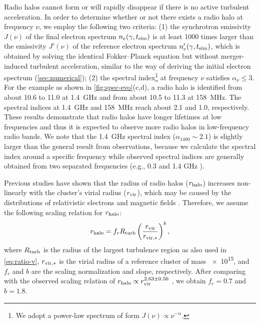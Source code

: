 Radio halos cannot form or will rapidly disappear if there is no active
turbulent acceleration.
In order to determine whether or not there exists a radio halo at frequency
$\nu$, we employ the following two criteria:
(1) the synchrotron emissivity $J(\nu)$ of the final electron spectrum
$n_e(\gamma, t_{\mathrm{sim}})$ is at least \num{1000} times larger than the
emissivity $J'(\nu)$ of the reference electron spectrum
$n'_e(\gamma, t_{\mathrm{sim}})$, which is obtained by solving the identical
Fokker--Planck equation but without merger-induced turbulent acceleration,
similar to the way of deriving the initial electron spectrum
(\autoref{sec:numerical});
(2) the spectral index\footnote{%
  We adopt a power-law spectrum of form $J(\nu) \propto \nu^{-\alpha}$.}
at frequency $\nu$ satisfies $\alpha_{\nu} \le 3$.
For the example as shown in \autoref{fig:spec-evo}(c,d), a radio halo
is identified from about 10.6 to 11.0 \si{\Gyr} at \SI{1.4}{\GHz} and
from about 10.5 to 11.3 \si{\Gyr} at \SI{158}{\MHz}.
The spectral indices at \SI{1.4}{\GHz} and \SI{158}{\MHz} reach about 2.1
and 1.0, respectively.
These results demonstrate that radio halos have longer lifetimes at low
frequencies and thus it is expected to observe more radio halos in
low-frequency radio bands.
We note that the \SI{1.4}{\GHz} spectral index ($\alpha_{1400} \sim 2.1$)
is slightly larger than the general result from observations,
because we calculate the spectral index around a specific frequency while
observed spectral indices are generally obtained from two separated
frequencies (e.g., 0.3 and 1.4 GHz \cite{feretti2012}).

Previous studies \cite{cassano2007,basu2012}
have shown that the radius of radio halos ($r_{\mathrm{halo}}$)
increases non-linearly with the cluster's virial radius ($r_{\mathrm{vir}}$),
which may be caused by the distributions of relativistic electrons and
magnetic fields \cite{dolag2002}.
Therefore, we assume the following scaling relation for $r_{\mathrm{halo}}$:
\begin{equation}
  \label{eq:r-halo}
  r_{\mathrm{halo}} = f_r R_{\mathrm{turb}}
    \left( \frac{r_{\mathrm{vir}}}{r_{\mathrm{vir,*}}} \right)^b ,
\end{equation}
where
$R_{\mathrm{turb}}$ is the radius of the largest turbulence region as also used
in \autoref{eq:ratio-v},
$r_{\mathrm{vir,*}}$ is the virial radius of a reference cluster of mass
\SI{e15}{\solarmass},
and $f_r$ and $b$ are the scaling normalization and slope, respectively.
After comparing with the observed scaling relation of
$r_{\mathrm{halo}} \propto r_{\mathrm{vir}}^{2.63 \pm 0.50}$ \cite{cassano2007},
we obtain $f_r = 0.7$ and $b = 1.8$.

